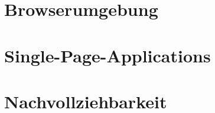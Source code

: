 \section{Browserumgebung}
\label{sec:browserumgebung}


\section{Single-Page-Applications}
\label{sec:single-page-applications}

	

%


\section{Nachvollziehbarkeit}
\label{sec:nachvollziehbarkeit}
